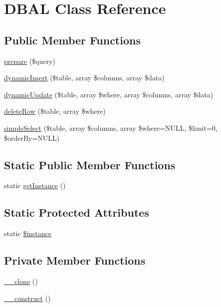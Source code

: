 \hypertarget{class_d_b_a_l}{}\section{D\+B\+A\+L Class Reference}
\label{class_d_b_a_l}
\subsection*{Public Member Functions}
\begin{DoxyCompactItemize}
\item 
\hyperlink{class_d_b_a_l_a008a39a69d47048bd395c3c63c529ed5}{prepare} (\$query)
\item 
\hyperlink{class_d_b_a_l_a95860e8df75ae87cb665e6f6f6d00016}{dynamic\+Insert} (\$table, array \$columns, array \$data)
\item 
\hyperlink{class_d_b_a_l_ac55b38f92f3f092e60b00ecf0ac56d2d}{dynamic\+Update} (\$table, array \$where, array \$columns, array \$data)
\item 
\hyperlink{class_d_b_a_l_a1c2972b596a6b8923bd8930301e165f5}{delete\+Row} (\$table, array \$where)
\item 
\hyperlink{class_d_b_a_l_af9b4977008273145eb78c0746bcd07bc}{simple\+Select} (\$table, array \$columns, array \$where=N\+U\+L\+L, \$limit=0, \$order\+By=N\+U\+L\+L)
\end{DoxyCompactItemize}
\subsection*{Static Public Member Functions}
\begin{DoxyCompactItemize}
\item 
static \hyperlink{class_d_b_a_l_ac93fbec81f07e5d15f80db907e63dc10}{get\+Instance} ()
\end{DoxyCompactItemize}
\subsection*{Static Protected Attributes}
\begin{DoxyCompactItemize}
\item 
static \hyperlink{class_d_b_a_l_ad9d7ce33ebb142b70e58b68052ca0ea8}{\$instance}
\end{DoxyCompactItemize}
\subsection*{Private Member Functions}
\begin{DoxyCompactItemize}
\item 
\hyperlink{class_d_b_a_l_ad0cb87b388bc74d63dc884accdca8713}{\+\_\+\+\_\+clone} ()
\item 
\hyperlink{class_d_b_a_l_a095c5d389db211932136b53f25f39685}{\+\_\+\+\_\+construct} ()
\end{DoxyCompactItemize}


